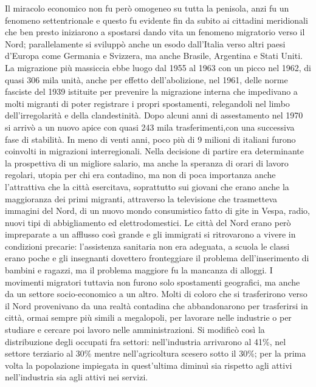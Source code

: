Il miracolo economico non fu però omogeneo su tutta la penisola, anzi fu un fenomeno settentrionale e questo fu evidente fin da subito ai cittadini meridionali che ben presto iniziarono a spostarsi dando vita un fenomeno migratorio verso il Nord; parallelamente si sviluppò anche un esodo dall'Italia verso altri paesi d'Europa come Germania e Svizzera, ma anche Brasile, Argentina e Stati Uniti. La migrazione più massiccia ebbe luogo dal 1955 al 1963 con un picco nel 1962, di quasi 306 mila unità, anche per effetto dell'abolizione, nel 1961, delle norme fasciste del 1939 istituite per prevenire la migrazione interna che impedivano a molti migranti di poter registrare i propri spostamenti, relegandoli nel limbo dell'irregolarità e della clandestinità.
Dopo alcuni anni di assestamento nel 1970 si arrivò a un nuovo apice con quasi 243 mila trasferimenti,con una successiva fase di stabilità.
In meno di venti anni, poco più di 9 milioni di italiani furono coinvolti in migrazioni interregionali.
Nella decisione di partire era determinante la prospettiva di un migliore salario, ma anche la speranza di orari di lavoro regolari, utopia per chi era contadino, ma non di poca importanza anche l'attrattiva che la città esercitava, soprattutto sui giovani che erano anche la maggioranza dei primi migranti, attraverso la televisione che trasmetteva immagini del Nord, di un nuovo mondo consumistico fatto di gite in Vespa, radio, nuovi tipi di abbigliamento ed elettrodomestici.
Le città del Nord erano però impreparate a un afflusso così grande e gli immigrati si ritrovarono a vivere in condizioni precarie: l'assistenza sanitaria non era adeguata, a scuola le classi erano poche e gli insegnanti dovettero fronteggiare il problema dell'inserimento di bambini e ragazzi, ma il problema maggiore fu la mancanza di alloggi.
I movimenti migratori tuttavia non furono solo spostamenti geografici, ma anche da un settore socio-economico a un altro.
Molti di coloro che si trasferirono verso il Nord provenivano da una realtà contadina che abbandonarono per trasferirsi in città, ormai sempre più simili a megalopoli, per lavorare nelle industrie o per studiare e cercare poi lavoro nelle amministrazioni. 
Si modificò così la distribuzione degli occupati fra settori: nell'industria arrivarono al 41\%, nel settore terziario al 30\% mentre nell'agricoltura scesero sotto il 30\%; per la prima volta la popolazione impiegata in quest'ultima diminuì sia rispetto agli attivi nell'industria sia agli attivi nei servizi.
